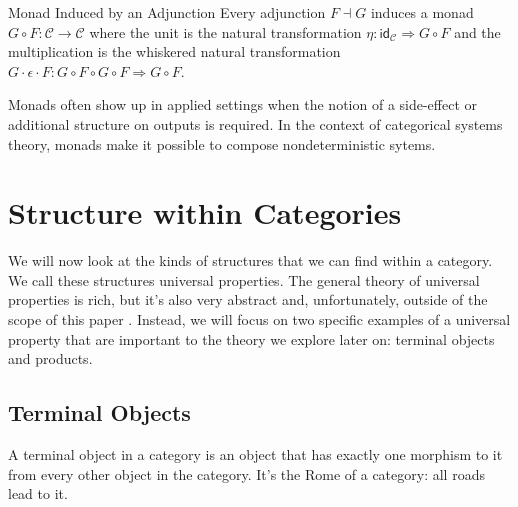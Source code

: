 \documentclass[12pt]{article}
\newcounter{examp}
\begin{document}
\begin{definition}{Monad Induced by an Adjunction}{}
    Every adjunction $F \dashv G$ induces a monad $G \circ F: \mathcal{C} \rightarrow \mathcal{C}$ where the unit is the natural transformation $\eta : \mathsf{id}_\mathcal{C} \Rightarrow G \circ F$ and the multiplication is the whiskered natural transformation $G \cdot \epsilon \cdot F: G \circ F \circ G \circ F \Rightarrow G \circ F$.
\end{definition}

Monads often show up in applied settings when the notion of a side-effect or additional structure on outputs is required.
In the context of categorical systems theory, monads make it possible to compose nondeterministic sytems.










\section*{Structure within Categories}

We will now look at the kinds of structures that we can find within a category.
We call these structures universal properties.
The general theory of universal properties is rich, but it's also very abstract and, unfortunately, outside of the scope of this paper \cite{riehl2017category}.
Instead, we will focus on two specific examples of a universal property that are important to the theory we explore later on: terminal objects and products.

\subsection*{Terminal Objects}
A terminal object in a category is an object that has exactly one morphism to it from every other object in the category.
It's the Rome of a category: all roads lead to it.
\end{document}
